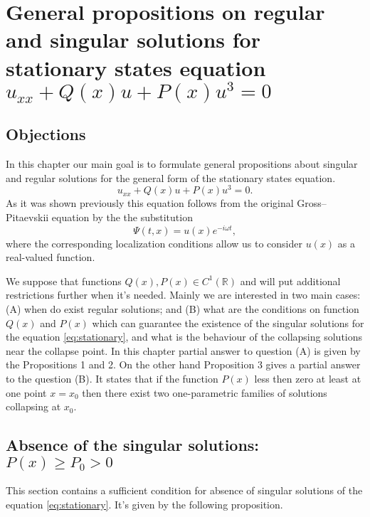 \chapter{General propositions on regular and singular solutions for stationary states equation $u_{xx} + Q(x) u + P(x) u^3 = 0$}

\section{Objections}

In this chapter our main goal is to formulate general propositions about singular and regular solutions for the general form of the stationary states equation.
\begin{equation}
	u_{xx} + Q(x) u + P(x) u^3 = 0.
	\label{eq:stationary}
\end{equation}
As it was shown previously this equation follows from the original Gross--Pitaevskii equation by the the substitution
\begin{equation}
	\Psi(t, x) = u(x) e^{-i \omega t},
\end{equation}
where the corresponding localization conditions allow us to consider $u(x)$ as a real-valued function.

We suppose that functions $Q(x), P(x) \in C^1(\mathbb{R})$ and will put additional restrictions further when it's needed.
Mainly we are interested in two main cases: (A) when do exist regular solutions; and (B) what are the conditions on function $Q(x)$ and $P(x)$ which can guarantee the existence of the singular solutions for the equation \eqref{eq:stationary}, and what is the behaviour of the collapsing solutions near the collapse point.
In this chapter partial answer to question (A) is given by the Propositions 1 and 2.
On the other hand Proposition 3 gives a partial answer to the question (B).
It states that if the function $P(x)$ less then zero at least at one point $x = x_0$ then there exist two one-parametric families of solutions collapsing at $x_0$.

\section{Absence of the singular solutions: $P(x) \ge P_0 > 0$}

This section contains a sufficient condition for absence of singular solutions of the equation \eqref{eq:stationary}.
It's given by the following proposition.

